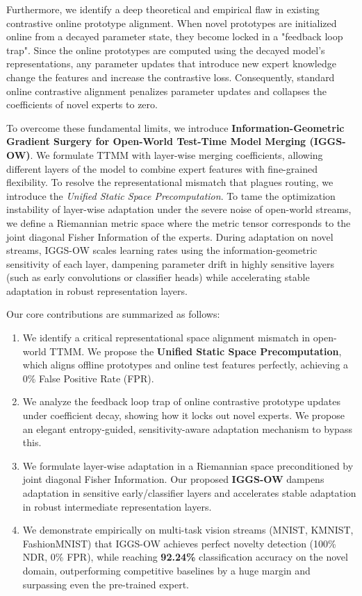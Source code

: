 \documentclass{article}
\theoremstyle{plain}
\theoremstyle{definition}
\theoremstyle{remark}
\begin{document}
Furthermore, we identify a deep theoretical and empirical flaw in existing contrastive online prototype alignment. When novel prototypes are initialized online from a decayed parameter state, they become locked in a "feedback loop trap". Since the online prototypes are computed using the decayed model's representations, any parameter updates that introduce new expert knowledge change the features and increase the contrastive loss. Consequently, standard online contrastive alignment penalizes parameter updates and collapses the coefficients of novel experts to zero.

To overcome these fundamental limits, we introduce \textbf{Information-Geometric Gradient Surgery for Open-World Test-Time Model Merging (IGGS-OW)}. We formulate TTMM with layer-wise merging coefficients, allowing different layers of the model to combine expert features with fine-grained flexibility. To resolve the representational mismatch that plagues routing, we introduce the \textit{Unified Static Space Precomputation}. To tame the optimization instability of layer-wise adaptation under the severe noise of open-world streams, we define a Riemannian metric space where the metric tensor corresponds to the joint diagonal Fisher Information of the experts. During adaptation on novel streams, IGGS-OW scales learning rates using the information-geometric sensitivity of each layer, dampening parameter drift in highly sensitive layers (such as early convolutions or classifier heads) while accelerating stable adaptation in robust representation layers.

Our core contributions are summarized as follows:
\begin{enumerate}
    \item We identify a critical representational space alignment mismatch in open-world TTMM. We propose the \textbf{Unified Static Space Precomputation}, which aligns offline prototypes and online test features perfectly, achieving a 0\% False Positive Rate (FPR).
    \item We analyze the feedback loop trap of online contrastive prototype updates under coefficient decay, showing how it locks out novel experts. We propose an elegant entropy-guided, sensitivity-aware adaptation mechanism to bypass this.
    \item We formulate layer-wise adaptation in a Riemannian space preconditioned by joint diagonal Fisher Information. Our proposed \textbf{IGGS-OW} dampens adaptation in sensitive early/classifier layers and accelerates stable adaptation in robust intermediate representation layers.
    \item We demonstrate empirically on multi-task vision streams (MNIST, KMNIST, FashionMNIST) that IGGS-OW achieves perfect novelty detection (100\% NDR, 0\% FPR), while reaching \textbf{92.24\%} classification accuracy on the novel domain, outperforming competitive baselines by a huge margin and surpassing even the pre-trained expert.
\end{enumerate}
\end{document}
